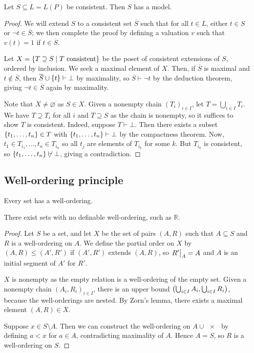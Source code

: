 \begin{theorem}
    Let \( S \subseteq L = L(P) \) be consistent.
    Then \( S \) has a model.
\end{theorem}
\begin{proof}
    We will extend \( S \) to a consistent set \( \overline S \) such that for all \( t \in L \), either \( t \in S \) or \( \neg t \in \overline S \); we then complete the proof by defining a valuation \( v \) such that \( v(t) = 1 \) if \( t \in \overline S \).

    Let \( X = \qty{T \supseteq S \mid T \text{ consistent}} \) be the poset of consistent extensions of \( S \), ordered by inclusion.
    We seek a maximal element of \( X \).
    Then, if \( \overline S \) is maximal and \( t \not\in \overline S \), then \( \overline S \cup \qty{t} \vdash \bot \) by maximality, so \( \overline S \vdash \neg t \) by the deduction theorem, giving \( \neg t \in \overline S \) again by maximality.

    Note that \( X \neq \varnothing \) as \( S \in X \).
    Given a nonempty chain \( (T_i)_{i \in I} \), let \( T = \bigcup_{i \in I} T_i \).
    We have \( T \supseteq T_i \) for all \( i \) and \( T \supseteq S \) as the chain is nonempty, so it suffices to show \( T \) is consistent.
    Indeed, suppose \( T \vdash \bot \).
    Then there exists a subset \( \qty{t_1, \dots, t_n} \in T \) with \( \qty{t_1, \dots, t_n} \vdash \bot \) by the compactness theorem.
    Now, \( t_1 \in T_{i_1}, \dots, t_n \in T_{i_n} \) so all \( t_j \) are elements of \( T_{i_k} \) for some \( k \).
    But \( T_{i_k} \) is consistent, so \( \qty{t_1, \dots, t_n} \not\vdash \bot \), giving a contradiction.
\end{proof}

\subsection{Well-ordering principle}
\begin{theorem}
    Every set has a well-ordering.
\end{theorem}
There exist sets with no definable well-ordering, such as \( \mathbb R \).
\begin{proof}
    Let \( S \) be a set, and let \( X \) be the set of pairs \( (A, R) \) such that \( A \subseteq S \) and \( R \) is a well-ordering on \( A \).
    We define the partial order on \( X \) by \( (A, R) \leq (A', R') \) if \( (A', R') \) extends \( (A, R) \), so \( \eval{R'}_A = A \) and \( A \) is an initial segment of \( A' \) for \( R' \).

    \( X \) is nonempty as the empty relation is a well-ordering of the empty set.
    Given a nonempty chain \( (A_i, R_i)_{i \in I} \), there is an upper bound \( \qty(\bigcup_{i \in I} A_i, \bigcup_{i \in I} R_i) \), because the well-orderings are nested.
    By Zorn's lemma, there exists a maximal element \( (A, R) \in X \).

    Suppose \( x \in S \setminus A \).
    Then we can construct the well-ordering on \( A \cup \qty{x} \) by defining \( a < x \) for \( a \in A \), contradicting maximality of \( A \).
    Hence \( A = S \), so \( R \) is a well-ordering on \( S \).
\end{proof}

